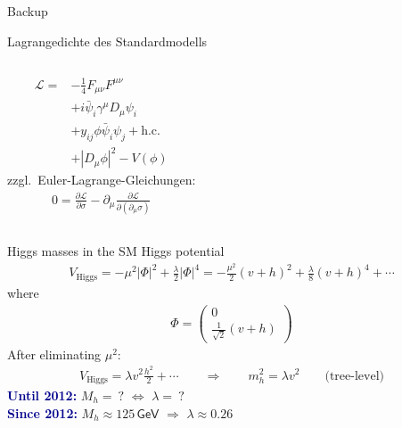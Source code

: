 \documentclass[hyperref={pdfpagelabels=false},ngerman]{beamer}
\newcommand{\eh}[1]{\,\mathsf{#1}}
\newcommand{\Lagr}{\mathcal{L}}
\renewcommand{\emph}[1]{\textbf{\textcolor{darkblue}{#1}}}
\begin{document}

\begin{frame}[noframenumbering]
  \begin{center}
    \Huge Backup
  \end{center}
\end{frame}


\begin{frame}[noframenumbering]{Lagrangedichte des Standardmodells}
  \begin{columns}
    \begin{align*}
        \Lagr ={}& -\frac{1}{4} F_{\mu\nu} F^{\mu\nu} \\
        & + i \bar{\psi}_i \gamma^\mu D_\mu \psi_i \\
        & + y_{ij} \phi \bar{\psi}_i \psi_j + \text{h.c.} \\
        & + |D_\mu \phi|^2 - V(\phi)
    \end{align*}
    zzgl.\ Euler-Lagrange-Gleichungen:
    \begin{align*}
      0 = \frac{\partial\Lagr}{\partial\sigma} - \partial_\mu \frac{\partial\Lagr}{\partial(\partial_\mu\sigma)}
    \end{align*}
  \end{columns}
\end{frame}

\begin{frame}[noframenumbering]{Higgs masses in the SM}
  Higgs potential
  \begin{align*}
    V_{\text{Higgs}} = -\mu^2 |\Phi|^2 + \frac{\lambda}{2}|\Phi|^4
    = -\frac{\mu^2}{2} (v+h)^2 + \frac{\lambda}{8} (v+h)^4 + \cdots
  \end{align*}
  where
  \begin{align*}
    \Phi =
    \begin{pmatrix}
      0 \\ \frac{1}{\sqrt{2}} (v + h)
    \end{pmatrix}
  \end{align*}
  After eliminating $\mu^2$:
  \begin{align*}
    V_{\text{Higgs}} = \lambda v^2 \frac{h^2}{2} + \cdots
    \qquad\Rightarrow\qquad
    m_h^2 = \lambda v^2  \qquad \text{(tree-level)}
  \end{align*}
  \emph{Until 2012:} $M_h =\ ?$ $\Leftrightarrow$ $\lambda =\ ?$\\
  \emph{Since 2012:} $M_h \approx 125\eh{GeV}$ $\Rightarrow$ $\lambda \approx 0.26$
\end{frame}
\end{document}
